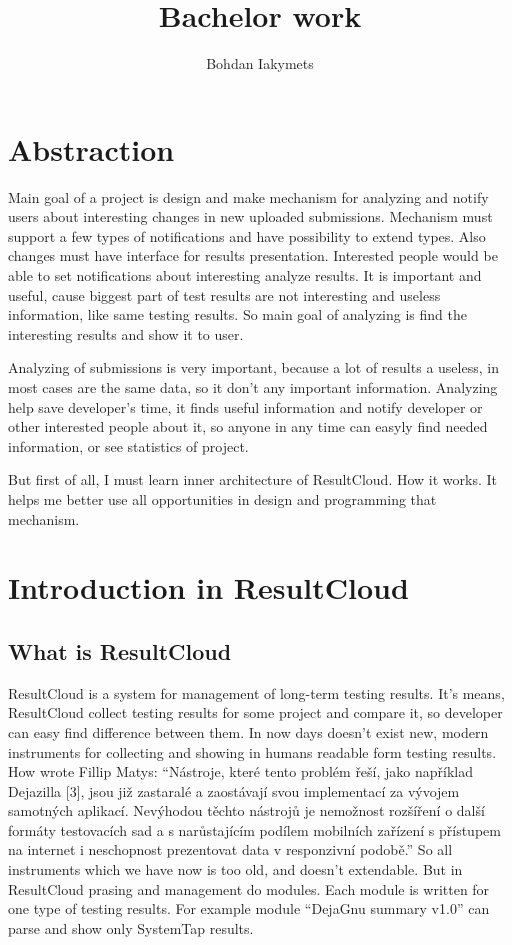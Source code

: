 \documentclass[a4paper,11pt]{article}
\title{Bachelor work \\[1mm]}
\author{Bohdan Iakymets \\ \email{xiakym00@stud.fit.vutbr.cz}}
\date{}
\begin{document}
\maketitle
\section{Abstraction}

Main goal of a project is design and make mechanism for analyzing and notify users about interesting changes in new uploaded submissions. Mechanism must support a few types of notifications and have possibility to extend types. Also changes must have interface for results presentation. Interested people would be able to set notifications about interesting analyze results.
It is important and useful, cause biggest part of test results are not interesting and useless information, like same testing results. So main goal of analyzing is find the interesting results and show it to user.

Analyzing of submissions is very important, because a lot of results a useless, in most cases are the same data, so it don't any important information. Analyzing help save developer's time, it finds useful information and notify developer or other interested people about it, so anyone in any time can easyly find needed information, or see statistics of project.

But first of all, I must learn inner architecture of ResultCloud. How it works. It helps me better use all opportunities in design and programming that mechanism.

\section{Introduction in ResultCloud}
\subsection{What is ResultCloud}

ResultCloud is a system for management of long-term testing results. It's means, ResultCloud collect testing results for some project and compare it, so developer can easy find difference between them. In now days doesn't exist new, modern instruments for collecting and showing in humans readable form testing results. How wrote Fillip Matys: “Nástroje, které tento problém řeší, jako například Dejazilla [3], jsou již zastaralé a zaostávají svou implementací za vývojem samotných aplikací. Nevýhodou těchto nástrojů je nemožnost rozšíření o další formáty testovacích sad a s narůstajícím podílem mobilních zařízení s přístupem na internet i neschopnost prezentovat data v responzivní podobě.” So all instruments which we have now is too old, and doesn't extendable. But in ResultCloud prasing and management do modules. Each module is written for one type of testing results. For example module “DejaGnu summary v1.0” can parse and show only SystemTap results. 
\end{document}

